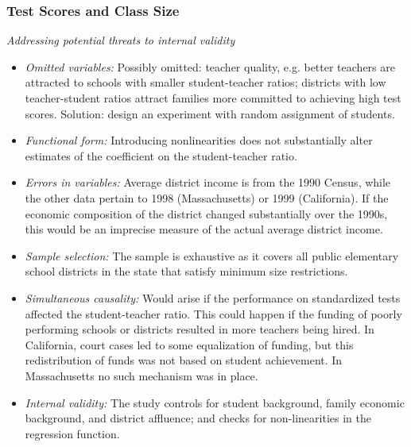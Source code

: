 \begin{frame}[shrink=10]
\frametitle{Test Scores and Class Size}
\emph{Addressing potential threats to internal validity} 
\begin{itemize}
\item \emph{Omitted variables:}
Possibly omitted: teacher quality, e.g. better teachers are attracted to schools with smaller student-teacher ratios; districts with low teacher-student ratios attract families more committed to achieving high test scores.
Solution: design an experiment with random assignment of students.
\item \emph{Functional form:}
Introducing nonlinearities does not substantially alter estimates of the coefficient on the student-teacher ratio. 
\item \emph{Errors in variables:}
Average district income is from the 1990 Census, while the other data pertain to 1998 (Massachusetts) or 1999 (California). If the economic composition of the district changed substantially over the 1990s, this would be an imprecise measure of the actual average district income.
\item \emph{Sample selection:}
The sample is exhaustive as it covers all public elementary school districts in the state that satisfy minimum size restrictions. 
\item \emph{Simultaneous causality:}
Would arise if the performance on standardized tests affected the student-teacher ratio. This could happen if the funding of poorly performing schools or districts resulted in more teachers being hired. In California, court cases led to some equalization of funding, but this redistribution of funds was not based on student achievement. In Massachusetts no such mechanism was in place.
\item \emph{Internal validity:} The study controls for student background, family economic background, and district affluence; and checks for non-linearities in the regression function.
\end{itemize}
\end{frame}
